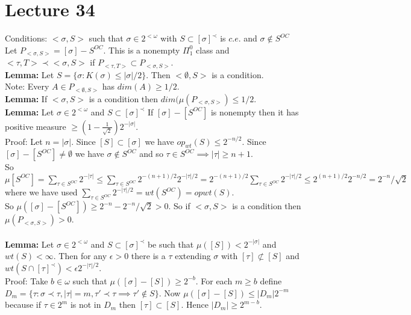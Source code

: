 \documentclass{article}
\begin{document}
   \section{Lecture 34}
   Conditions: $<\sigma,S>$ such that $\sigma \in 2^{<\omega}$ with $S \subset [\sigma]^\prec$ is $c.e.$ and $\sigma \not \in S^{OC}$\\
   Let $P_{<\sigma,S>} = [\sigma] - S^{OC}$. This is a nonempty $\Pi^0_1$ class and $<\tau, T> \prec < \sigma,S> $ if $P_{<\tau,T>} \subset P_{<\sigma,S>}$.\\
   \textbf{Lemma:} Let $S = \{\sigma : K(\sigma) \leq |\sigma|/2\}$. Then $<\emptyset,S>$ is a condition. \\
   Note: Every $A \in P_{<\emptyset,S>}$ has $dim(A)\geq 1/2$.\\
   \textbf{Lemma:} If $<\sigma,S>$ is a condition then $dim(\mu(P_{<\sigma,S>}) \leq 1/2$.\\
   \textbf{Lemma:} Let $\sigma \in 2^{<\omega}$ and $S \subset [\sigma]^\prec$ If $[\sigma]- [S^{OC}]$ is nonempty then it has positive measure $\geq (1-\frac 1 {\sqrt 2})2^{-|\sigma|}$.\\
   Proof: Let $n = |\sigma|$. Since $[S] \subset [\sigma]$ we have $op_{wt} (S) \leq 2^{-n/2}$. Since $[\sigma] - [S^{OC}] \neq \emptyset$ we have $\sigma \not \in S^{OC}$ and so $\tau \in S^{OC} \implies |\tau| \geq n+1$. \\
   So $\mu[S^{OC}] = \sum_{\tau \in S^{OC} }2^{-|\tau|} \leq \sum_{\tau \in S^{OC}} 2^{-(n+1)/2} 2^{-|\tau|/2} = 2^{-(n+1)/2}\sum_{\tau \in S^{OC}} 2^{-|\tau|/2} \leq 2^{(n+1)/2} 2^{-n/2} = 2^{-n}/\sqrt 2$ where we have used $\sum_{\tau \in S^{OC}} 2^{-|\tau|/2} = wt(S^{OC}) = opwt(S)$. \\
   So $\mu([\sigma] - [S^{OC}]) \geq 2^{-n} - 2^{-n}/\sqrt 2 > 0$.
   So if $<\sigma, S> $ is a condition then $\mu(P_{<\sigma,S>})> 0$.\\\\
   \textbf{Lemma:} Let $\sigma \in 2^{< \omega}$ and $S \subset [\sigma]^\prec$ be such that $ \mu([S])   < 2^{-|\sigma|}$ and $wt(S) < \infty$. Then for any $\epsilon > 0$ there is a $\tau $ extending $\sigma$ with $[\tau] \not \subset [S]$ and $wt(S\cap[\tau]^\prec) < \epsilon 2^{-|\tau|/2}$.\\
   Proof: Take $b \in \omega$ such that $\mu([\sigma]- [S]) \geq 2^{-b}$. For each $m \geq b$ define $D_m = \{\tau : \sigma \prec \tau , |\tau| = m, \tau' \prec \tau \implies \tau' \not \in S\}$. Now $\mu([\sigma] - [S]) \leq |D_m| 2^{-m}$ because if $\tau \in 2^m$ is not in $D_m$ then $[\tau ] \subset [S]$. Hence $|D_m| \geq 2^{m-b}$.\\
\end{document}
